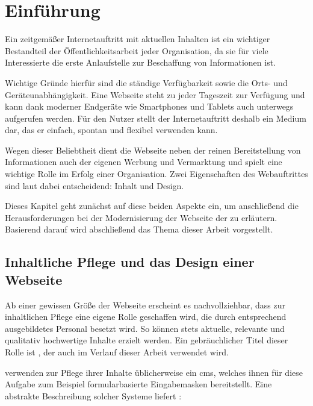 \chapter{Einführung}
    \label{chapter:introduction}
    Ein zeitgemäßer Internetauftritt mit aktuellen Inhalten
    ist ein wichtiger Bestandteil der Öffentlichkeitsarbeit jeder Organisation,
    da sie für viele Interessierte die erste Anlaufstelle zur Beschaffung von Informationen ist.

    Wichtige Gründe hierfür sind die ständige Verfügbarkeit sowie die Orts-
    und Geräteunabhängigkeit.
    Eine Webseite steht zu jeder Tageszeit zur Verfügung und kann
    dank moderner Endgeräte wie Smartphones und Tablets
    auch unterwegs aufgerufen werden.
    Für den Nutzer stellt der Internetauftritt deshalb ein Medium dar,
    das er einfach, spontan und flexibel verwenden kann.

    Wegen dieser Beliebtheit dient die Webseite neben der reinen Bereitstellung von Informationen
    auch der eigenen Werbung und Vermarktung und spielt eine wichtige Rolle im Erfolg einer Organisation.
    Zwei Eigenschaften des Webauftrittes sind laut \cite{sillence:onlineHealthSites} dabei
    entscheidend: Inhalt und Design.

    Dieses Kapitel geht zunächst auf diese beiden Aspekte ein,
    um anschließend die Herausforderungen bei der Modernisierung der Webseite der {\fernUni} zu erläutern.
    Basierend darauf wird abschließend das Thema dieser Arbeit vorgestellt.
    
    \section{Inhaltliche Pflege und das Design einer Webseite}
        Ab einer gewissen Größe der Webseite erscheint es nachvollziehbar,
        dass zur inhaltlichen Pflege eine eigene Rolle geschaffen wird,
        die durch entsprechend ausgebildetes Personal besetzt wird.
        So können stets aktuelle, relevante und qualitativ hochwertige Inhalte erzielt werden.
        Ein gebräuchlicher Titel dieser Rolle ist \textit{\editor},
        der auch im Verlauf dieser Arbeit verwendet wird.

        {\editors} verwenden zur Pflege ihrer Inhalte üblicherweise ein \gls{cms},
        welches ihnen für diese Aufgabe zum Beispiel formularbasierte Eingabemasken bereitstellt.
        Eine abstrakte Beschreibung solcher Systeme liefert \cite[][Seite 5,6]{barker:webCMS}:

